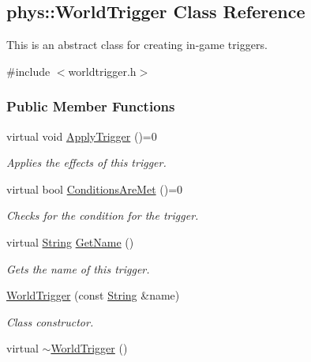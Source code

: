 \hypertarget{classphys_1_1WorldTrigger}{
\subsection{phys::WorldTrigger Class Reference}
\label{classphys_1_1WorldTrigger}
}


This is an abstract class for creating in-\/game triggers.  




{\ttfamily \#include $<$worldtrigger.h$>$}

\subsubsection*{Public Member Functions}
\begin{DoxyCompactItemize}
\item 
\hypertarget{classphys_1_1WorldTrigger_adb7801edf1195f2f7791ad9c4d91af88}{
virtual void \hyperlink{classphys_1_1WorldTrigger_adb7801edf1195f2f7791ad9c4d91af88}{ApplyTrigger} ()=0}
\label{classphys_1_1WorldTrigger_adb7801edf1195f2f7791ad9c4d91af88}

\begin{DoxyCompactList}\small\item\em Applies the effects of this trigger. \item\end{DoxyCompactList}\item 
virtual bool \hyperlink{classphys_1_1WorldTrigger_aa95304a06027cd15bf56ad018c7adda8}{ConditionsAreMet} ()=0
\begin{DoxyCompactList}\small\item\em Checks for the condition for the trigger. \item\end{DoxyCompactList}\item 
virtual \hyperlink{namespacephys_aa03900411993de7fbfec4789bc1d392e}{String} \hyperlink{classphys_1_1WorldTrigger_a01805ed31ae69ade9e4ef21bef5f341e}{GetName} ()
\begin{DoxyCompactList}\small\item\em Gets the name of this trigger. \item\end{DoxyCompactList}\item 
\hyperlink{classphys_1_1WorldTrigger_a1876d1c7c58b10b2fd1ad1cb7727e6a6}{WorldTrigger} (const \hyperlink{namespacephys_aa03900411993de7fbfec4789bc1d392e}{String} \&name)
\begin{DoxyCompactList}\small\item\em Class constructor. \item\end{DoxyCompactList}\item 
\hypertarget{classphys_1_1WorldTrigger_ad70dd18dc895166db6cc890042b0203f}{
virtual \hyperlink{classphys_1_1WorldTrigger_ad70dd18dc895166db6cc890042b0203f}{$\sim$WorldTrigger} ()}
\label{classphys_1_1WorldTrigger_ad70dd18dc895166db6cc890042b0203f}


\end{DoxyCompactItemize}
